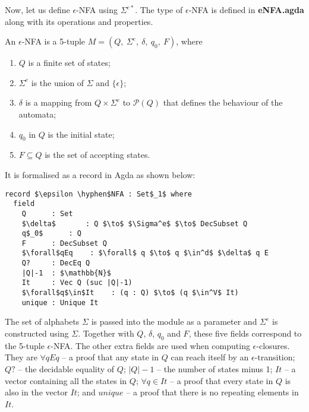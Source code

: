 \par Now, let us define \(\epsilon\)-NFA using \(\Sigma^{e*}\). The
type of \(\epsilon\)-NFA is defined in \textbf{eNFA.agda} along with its operations and
properties. 

\begin{defn}
\noindent An \(\epsilon\)-NFA is a 5-tuple \(M = (Q
,\ \Sigma^e,\ \delta,\ q_0,\ F)\), where
\begin{enumerate}[nolistsep]
  \item \(Q\) is a finite set of states;
  \item \(\Sigma^e\) is the union of \(\Sigma\) and \(\{\epsilon\}\);
  \item \(\delta\) is a mapping from \(Q \times \Sigma^e\) to
    \(\mathcal P \left({Q}\right)\) that defines the behaviour of the automata;
  \item \(q_0\) in \(Q\) is the initial state;
  \item \(F \subseteq Q\) is the set of accepting states. 
\end{enumerate}
\end{defn}

\par It is formalised as a record in Agda as shown below: 

\begin{lstlisting}[mathescape=true,xleftmargin=.3\textwidth]
record $\epsilon \hyphen$NFA : Set$_1$ where
  field
    Q      : Set
    $\delta$       : Q $\to$ $\Sigma^e$ $\to$ DecSubset Q
    q$_0$      : Q
    F      : DecSubset Q
    $\forall$qEq    : $\forall$ q $\to$ q $\in^d$ $\delta$ q E
    Q?     : DecEq Q
    |Q|-1  : $\mathbb{N}$
    It     : Vec Q (suc |Q|-1)
    $\forall$q$\in$It    : (q : Q) $\to$ (q $\in^V$ It)
    unique : Unique It
\end{lstlisting}

\par The set of alphabets \(\Sigma\) is passed into the module as a
parameter and \(\Sigma^e\) is constructed using \(\Sigma\). Together with \(Q\), \(\delta\),
\(q_0\) and \(F\), these five fields correspond to the 5-tuple
\(\epsilon\)-NFA. The other extra fields are used when computing
\(\epsilon\)-closures. They are \(\forall qEq\) -- a proof that any
state in \(Q\) can reach itself by an
\(\epsilon\)-transition; \(Q?\) -- the decidable equality of \(Q\);
\(|Q|-1\) -- the number of states minus 1; \(It\) -- a vector
containing all the states in \(Q\); \(\forall q\in It\)
-- a proof that every state in \(Q\) is also in the vector
\(It\); and \(unique\) -- a proof that there is no repeating elements in
\(It\). 

